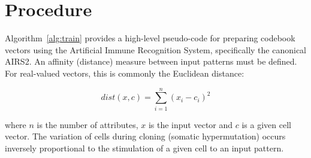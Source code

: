 \documentclass[a4paper, 11pt]{article}
\begin{document}
\section{Procedure}
\label{sec:procedure}
Algorithm~\ref{alg:train} provides a high-level pseudo-code for preparing codebook vectors using the Artificial Immune Recognition System, specifically the canonical AIRS2. 
An affinity (distance) measure between input patterns must be defined. For real-valued vectors, this is commonly the Euclidean distance:

\begin{equation}
	dist(x,c) = \sum_{i=1}^{n} (x_i - c_i)^2
\end{equation}

where $n$ is the number of attributes, $x$ is the input vector and $c$ is a given cell vector. The variation of cells during cloning (somatic hypermutation) occurs inversely proportional to the stimulation of a given cell to an input pattern.
\end{document}
